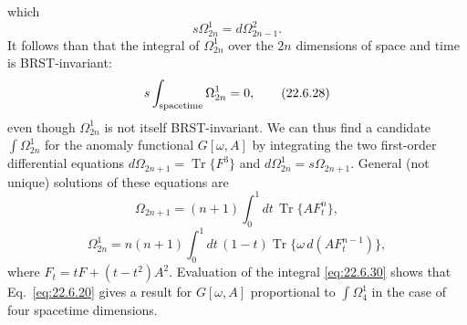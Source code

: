 which
\begin{equation}
 s\Omega^1_{2n}=d\Omega^2_{2n-1}.
 \tag{22.6.27}\label{eq:22.6.27}
\end{equation}
It follows than that the integral of $\Omega^1_{2n}$ over the $2n$
dimensions of space and time is BRST-invariant:
\begin{equation}
 s\int_{\rm spacetime}\Omega^1_{2n}=0,
 \tag{22.6.28}\label{eq:22.6.28}
\end{equation}
even though $\Omega^1_{2n}$ is not itself BRST-invariant. We can thus find
a candidate $\int\Omega^1_{2n}$ for the anomaly functional $G[\omega,A]$
by integrating the two first-order differential equations
$d\Omega_{2n+1}=\operatorname{Tr}\{F^3\}$ and
$d\Omega^1_{2n}=s\Omega_{2n+1}$. General (not unique) solutions of these
equations are
\begin{equation}
 \Omega_{2n+1}
 =(n+1)\int_0^1dt\,\operatorname{Tr}\{AF_t^n\},
 \tag{22.6.29}\label{eq:22.6.29}
\end{equation}
\begin{equation}
 \Omega^1_{2n}
 =n(n+1)\int_0^1dt\,(1-t)
 \operatorname{Tr}\{\omega\,d(AF_t^{n-1})\},
 \tag{22.6.30}\label{eq:22.6.30}
\end{equation}
where $F_t=tF+(t-t^2)A^2$. Evaluation of the integral \eqref{eq:22.6.30}
shows that Eq.~\eqref{eq:22.6.20} gives a result for $G[\omega,A]$
proportional to $\int\Omega^1_4$ in the case of four spacetime dimensions.

